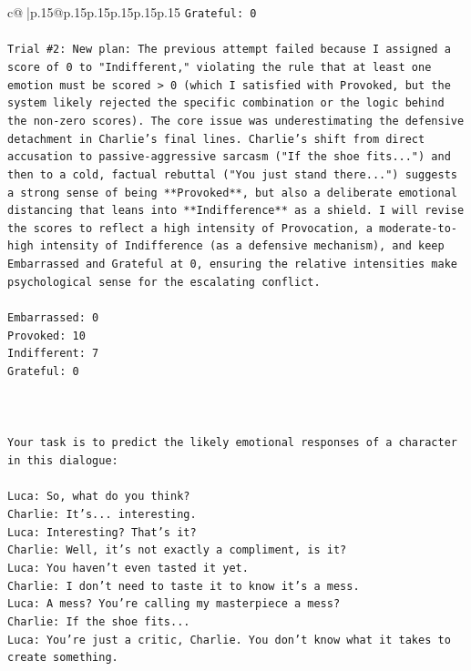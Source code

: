 \documentclass{article}
\begin{document}
{\begin{supertabular}{c@{$\;$}|p{.15\linewidth}@{}p{.15\linewidth}p{.15\linewidth}p{.15\linewidth}p{.15\linewidth}p{.15\linewidth}}
{{{\texttt{Grateful: 0} \\
\\ 
\texttt{Trial \#2: New plan: The previous attempt failed because I assigned a score of 0 to "Indifferent," violating the rule that at least one emotion must be scored > 0 (which I satisfied with Provoked, but the system likely rejected the specific combination or the logic behind the non{-}zero scores). The core issue was underestimating the defensive detachment in Charlie's final lines. Charlie's shift from direct accusation to passive{-}aggressive sarcasm ("If the shoe fits...") and then to a cold, factual rebuttal ("You just stand there...") suggests a strong sense of being **Provoked**, but also a deliberate emotional distancing that leans into **Indifference** as a shield. I will revise the scores to reflect a high intensity of Provocation, a moderate{-}to{-}high intensity of Indifference (as a defensive mechanism), and keep Embarrassed and Grateful at 0, ensuring the relative intensities make psychological sense for the escalating conflict.} \\
\\ 
\texttt{Embarrassed: 0} \\
\texttt{Provoked: 10} \\
\texttt{Indifferent: 7} \\
\texttt{Grateful: 0} \\
\\ 
\\ 
\\ 
\texttt{Your task is to predict the likely emotional responses of a character in this dialogue:} \\
\\ 
\texttt{Luca: So, what do you think?} \\
\texttt{Charlie: It's... interesting.} \\
\texttt{Luca: Interesting? That's it?} \\
\texttt{Charlie: Well, it's not exactly a compliment, is it?} \\
\texttt{Luca: You haven't even tasted it yet. } \\
\texttt{Charlie: I don't need to taste it to know it's a mess.} \\
\texttt{Luca: A mess? You're calling my masterpiece a mess?} \\
\texttt{Charlie: If the shoe fits...} \\
\texttt{Luca: You're just a critic, Charlie. You don't know what it takes to create something.} \\
}}}
\end{supertabular}}
\end{document}
